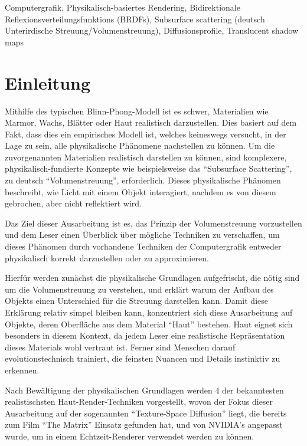 \documentclass[ngerman,runningheads,a4paper]{llncs}[2018/03/10]
\begin{document}
\begin{keywords}
  Computergrafik, Physikalisch-basiertes Rendering, Bidirektionale Reflexionsverteilungsfunktions (BRDFs), Subsurface scattering (deutsch Unterirdische Streuung/Volumenstreuung), Diffusionsprofile, Translucent shadow maps
\end{keywords}

\section{Einleitung}
\label{sec:intro}

Mithilfe des typischen Blinn-Phong-Modell ist es schwer, Materialien wie Marmor, Wachs, Blätter oder Haut realistisch darzustellen. Dies basiert auf dem Fakt, dass dies ein empirisches Modell ist, welches keineswegs versucht, in der Lage zu sein, alle physikalische Phänomene nachstellen zu können.
Um die zuvorgenannten Materialien realistisch darstellen zu können, sind komplexere, physikalisch-fundierte Konzepte wie beispielsweise das \enquote{Subsurface Scattering}, zu deutsch \enquote{Volumenstreuung}, erforderlich.
Dieses physikalische Phänomen beschreibt, wie Licht mit einem Objekt interagiert, nachdem es von diesem gebrochen, aber nicht reflektiert wird.

Das Ziel dieser Ausarbeitung ist es, das Prinzip der Volumenstreuung vorzustellen und dem Leser einen Überblick über mögliche Techniken zu verschaffen, um dieses Phänomen durch vorhandene Techniken der Computergrafik entweder physikalisch korrekt darzustellen oder zu approximieren.

Hierfür werden zunächst die physikalische Grundlagen aufgefrischt, die nötig sind um die Volumenstreuung zu verstehen, und erklärt warum der Aufbau des Objekts einen Unterschied für die Streuung darstellen kann.
Damit diese Erklärung relativ simpel bleiben kann, konzentriert sich diese Ausarbeitung auf Objekte, deren Oberfläche aus dem Material \enquote{Haut} bestehen.
Haut eignet sich besonders in diesem Kontext, da jedem Leser eine realistische Repräsentation dieses Materials wohl vertraut ist. Ferner sind Menschen darauf evolutionstechnisch trainiert, die feinsten Nuancen und Details instinktiv zu erkennen.

Nach Bewältigung der physikalischen Grundlagen werden 4 der bekanntesten realistischsten Haut-Render-Techniken vorgestellt, wovon der Fokus dieser Ausarbeitung auf der sogenannten \enquote{Texture-Space Diffusion} liegt, die bereits zum Film \enquote{The Matrix} Einsatz gefunden hat, und von NVIDIA's \citet{efficient-human-skin-rendering} angepasst wurde, um in einem Echtzeit-Renderer verwendet werden zu können.
\end{document}
